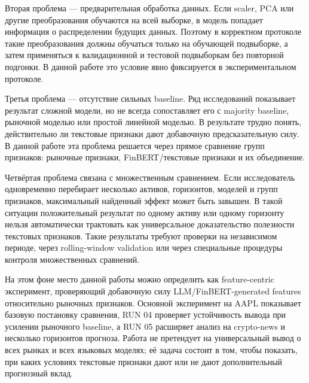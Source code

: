 Вторая проблема --- предварительная обработка данных. Если scaler, PCA или другие преобразования обучаются на всей выборке, в модель попадает информация о распределении будущих данных. Поэтому в корректном протоколе такие преобразования должны обучаться только на обучающей подвыборке, а затем применяться к валидационной и тестовой подвыборкам без повторной подгонки. В данной работе это условие явно фиксируется в экспериментальном протоколе.

Третья проблема --- отсутствие сильных baseline. Ряд исследований показывает результат сложной модели, но не всегда сопоставляет его с majority baseline, рыночной моделью или простой линейной моделью. В результате трудно понять, действительно ли текстовые признаки дают добавочную предсказательную силу. В данной работе эта проблема решается через прямое сравнение групп признаков: рыночные признаки, FinBERT/текстовые признаки и их объединение.

Четвёртая проблема связана с множественным сравнением. Если исследователь одновременно перебирает несколько активов, горизонтов, моделей и групп признаков, максимальный найденный эффект может быть завышен. В такой ситуации положительный результат по одному активу или одному горизонту нельзя автоматически трактовать как универсальное доказательство полезности текстовых признаков. Такие результаты требуют проверки на независимом периоде, через rolling-window validation или через специальные процедуры контроля множественных сравнений.

На этом фоне место данной работы можно определить как feature-centric эксперимент, проверяющий добавочную силу LLM/FinBERT-generated features относительно рыночных признаков. Основной эксперимент на AAPL показывает базовую постановку сравнения, RUN 04 проверяет устойчивость вывода при усилении рыночного baseline, а RUN 05 расширяет анализ на crypto-news и несколько горизонтов прогноза. Работа не претендует на универсальный вывод о всех рынках и всех языковых моделях; её задача состоит в том, чтобы показать, при каких условиях текстовые признаки дают или не дают дополнительный прогнозный вклад.
